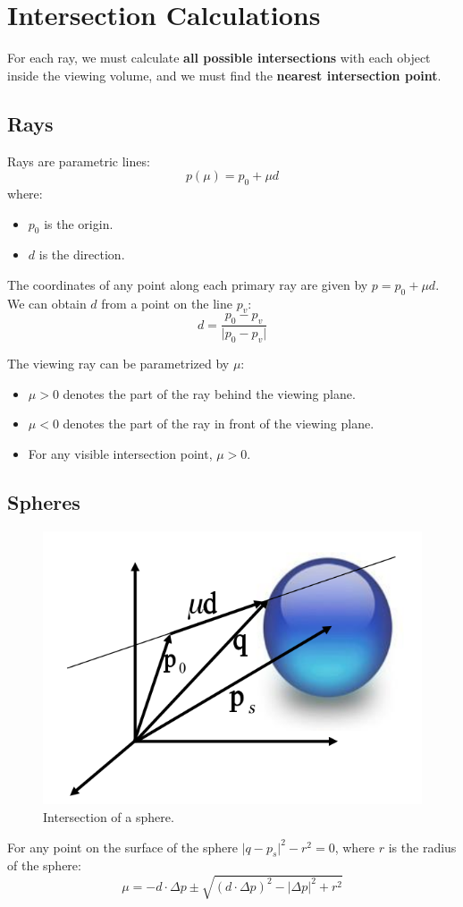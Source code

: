 \documentclass[11pt]{article}
\begin{document}
\section{Intersection Calculations}
For each ray, we must calculate \textbf{all possible intersections} with each object inside the viewing volume, and we must find the \textbf{nearest intersection point}.

\subsection{Rays}
Rays are parametric lines:
\[
  p(\mu) = p_0 + \mu d 
\]
where:
\begin{itemize}
  \item $p_0$ is the origin.
  \item $d$ is the direction.
\end{itemize}

The coordinates of any point along each primary ray are given by $p = p_0 + \mu d$.
We can obtain $d$ from a point on the line $p_v$:
\[
  d = \frac{p_0 - p_v}{\lvert p_0 - p_v \rvert} 
\]

The viewing ray can be parametrized by $\mu$:
\begin{itemize}
  \item $\mu > 0$ denotes the part of the ray behind the viewing plane.
  \item $\mu < 0$ denotes the part of the ray in front of the viewing plane.
  \item For any visible intersection point, $\mu > 0$.
\end{itemize}

\subsection{Spheres}
\begin{figure}[htb!]
  \centering
  \caption{Intersection of a sphere.}
  \includegraphics[scale=0.5]{sphereintersection}
\end{figure}
For any point on the surface of the sphere $\lvert q - p_s \rvert ^2 - r^2 = 0$, where
$r$ is the radius of the sphere:
\[
  \mu = -d \cdot \Delta p \pm \sqrt{(d \cdot \Delta p) ^2 - \lvert \Delta p \rvert ^2 + r^2} 
\]
\end{document}
